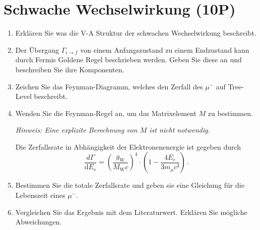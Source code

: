 \section{Schwache Wechselwirkung (10P)}

\begin{enumerate}
    \item Erklären Sie was die V-A Struktur der schwachen Wechselwirkung beschreibt.

    \item Der Übergang $\Gamma_{i \to f}$ von einem Anfangszustand zu einem Endzustand kann durch Fermis Goldene Regel beschrieben werden.
    Geben Sie diese an und beschreiben Sie ihre Komponenten.
    \item Zeichen Sie das Feynman-Diagramm, welches den Zerfall des $\mu^-$ auf Tree-Level beschreibt.
    \begin{solution}
        {}
    \end{solution}
    \item Wenden Sie die Feynman-Regel an, um das Matrixelement $M$ zu bestimmen.
    
    \textit{Hinweis: Eine explizite Berechnung von $M$ ist nicht notwendig.} 

    Die Zerfallsrate in Abhängigkeit der Elektronenenergie ist gegeben durch 
    \begin{equation}
        \dfrac{d \Gamma}{\mathrm{d} E_\text{e}} = \left(\dfrac{g_\text{W}}{M_\text{W}c}\right)^4 \cdot \left(1 - \dfrac{4 E_e}{3 m_\mu c²}\right) \,.
    \end{equation}
    \item Bestimmen Sie die totale Zerfallsrate und geben sie eine Gleichung für die Lebenszeit eines $\mu^-$.
    \item Vergleichen Sie das Ergebnis mit dem Literaturwert. Erklären Sie mögliche Abweichungen.


\end{enumerate}
